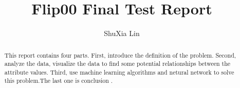 \documentclass{amsart}
\begin{document}
%
%
\title[A Short Running Title]{Flip00 Final Test Report}%

\author{ShuXia Lin}
\address[A.~1]{School of Computer Science,\\ 
SouthEast University, Nanjing , China}%




%
\date{\gitAuthorDate}%

\begin{abstract}
This report contains four parts. First, introduce the definition of the problem. 
Second, analyze the data, visualize the data to find some potential relationships between 
the attribute values. Third, use machine learning algorithms and netural network to solve 
this problem.The last one is conclusion . 
\end{abstract}

\maketitle
\tableofcontents

\newpage






\newpage



\listoftodos
\end{document}
